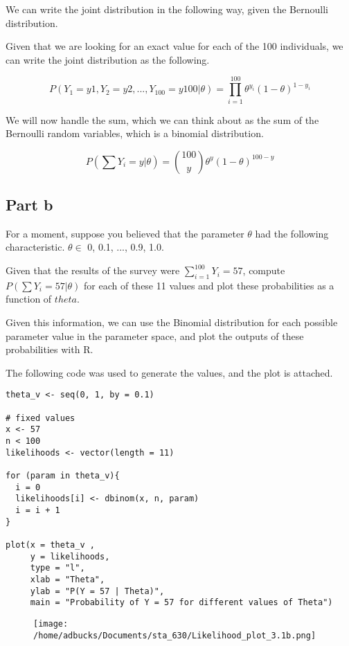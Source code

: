 \documentclass[12pt, letterpaper]{article}
\begin{document}
We can write the joint distribution in the following way, given the Bernoulli distribution. 

Given that we are looking for an exact value for each of the 100 individuals, we can write the joint distribution as the following. 

\begin{equation}
P(Y_1 = y1, Y_2 = y2, ..., Y_{100} = y100 | \theta) = \prod_{i=1}^{100} \theta^{y_i} (1 - \theta)^{1 - y_i} 
\end{equation} 

We will now handle the sum, which we can think about as the sum of the Bernoulli random variables, which is a binomial distribution. 

\begin{equation} 
P(\sum Y_i = y | \theta) = \binom{100}{y} \theta^y (1 - \theta)^{100 - y} 
\end{equation} 

\subsection{Part b} 

For a moment, suppose you believed that the parameter $\theta$ had the following characteristic. $\theta \in$ {0, 0.1, ..., 0.9, 1.0}. 

Given that the results of the survey were $\sum_{i=1}^100 Y_i = 57$, compute $P(\sum Y_i = 57 | \theta)$ for each of these 11 values and plot these probabilities as a function of $theta$. 

Given this information, we can use the Binomial distribution for each possible parameter value in the parameter space, and plot the outputs of these probabilities with R. 

The following code was used to generate the values, and the plot is attached. 

\begin{verbatim}
theta_v <- seq(0, 1, by = 0.1) 

# fixed values 
x <- 57 
n < 100 
likelihoods <- vector(length = 11) 

for (param in theta_v){
  i = 0 
  likelihoods[i] <- dbinom(x, n, param) 
  i = i + 1 
}

plot(x = theta_v , 
     y = likelihoods, 
     type = "l", 
     xlab = "Theta", 
     ylab = "P(Y = 57 | Theta)", 
     main = "Probability of Y = 57 for different values of Theta")
\end{verbatim}

\begin{figure}
\texttt{[image: /home/adbucks/Documents/sta\_630/Likelihood\_plot\_3.1b.png]}
\end{figure}
\end{document}
